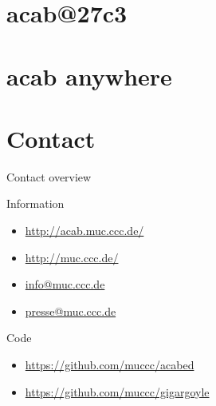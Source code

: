 \documentclass{beamer}
\begin{document}
\section{acab@27c3}

\section{acab anywhere}
\section{Contact}
\begin{frame}{Contact overview}
  \begin{block}{Information}
    \begin{itemize}
      \item \url{http://acab.muc.ccc.de/}
      \item \url{http://muc.ccc.de/}
      \item \url{info@muc.ccc.de}
      \item \url{presse@muc.ccc.de}
    \end{itemize}
  \end{block}
  \begin{block}{Code}
    \begin{itemize}
      \item \url{https://github.com/muccc/acabed}
      \item \url{https://github.com/muccc/gigargoyle}
    \end{itemize}
  \end{block}
\end{frame}
\end{document}
